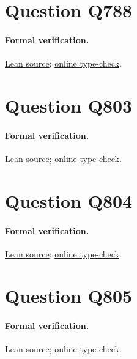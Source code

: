 \documentclass[11pt]{article}
\begin{document}
\section{Question Q788}

\paragraph{Formal verification.}
\href{https://github.com/l-pommeret/rms-math-proofs/blob/7236808fe7d650bdc8d3695b0ca3160ca0ec9517/lean/RMS/Q788Main.lean}{Lean source}; \href{https://github.com/l-pommeret/rms-math-proofs/actions/runs/31321483837}{online type-check}.

\section{Question Q803}

\paragraph{Formal verification.}
\href{https://github.com/l-pommeret/rms-math-proofs/blob/dc7f24515dd8a013fcf0062cee723c9b53c67a46/lean/RMS/Q803.lean}{Lean source}; \href{https://github.com/l-pommeret/rms-math-proofs/actions/runs/31287906856}{online type-check}.

\section{Question Q804}

\paragraph{Formal verification.}
\href{https://github.com/l-pommeret/rms-math-proofs/blob/0f3fd1e5190ef7df73c21119c5e65f72f7c4ff42/lean/RMS/Q804.lean}{Lean source}; \href{https://github.com/l-pommeret/rms-math-proofs/actions/runs/31289474407}{online type-check}.

\section{Question Q805}

\paragraph{Formal verification.}
\href{https://github.com/l-pommeret/rms-math-proofs/blob/033a4a76ffc343d941f0c59bcbafeaab31e4001a/lean/RMS/Q805.lean}{Lean source}; \href{https://github.com/l-pommeret/rms-math-proofs/actions/runs/31289894182}{online type-check}.
\end{document}
